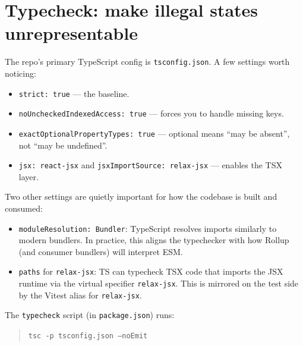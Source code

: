 \section{Typecheck: make illegal states unrepresentable}

The repo's primary TypeScript config is \texttt{tsconfig.json}.
A few settings worth noticing:

\begin{itemize}
\item \texttt{strict: true} --- the baseline.
\item \texttt{noUncheckedIndexedAccess: true} --- forces you to handle missing keys.
\item \texttt{exactOptionalPropertyTypes: true} --- optional means ``may be absent'', not ``may be undefined''.
\item \texttt{jsx: react-jsx} and \texttt{jsxImportSource: relax-jsx} --- enables the TSX layer.
\end{itemize}

Two other settings are quietly important for how the codebase is built and consumed:

\begin{itemize}
\item \texttt{moduleResolution: Bundler}: TypeScript resolves imports similarly to modern bundlers.
In practice, this aligns the typechecker with how Rollup (and consumer bundlers) will interpret ESM.
\item \texttt{paths} for \texttt{relax-jsx}: TS can typecheck TSX code that imports the JSX runtime via the virtual specifier \texttt{relax-jsx}.
This is mirrored on the test side by the Vitest alias for \texttt{relax-jsx}.
\end{itemize}

The \texttt{typecheck} script (in \texttt{package.json}) runs:

\begin{quote}
\texttt{tsc -p tsconfig.json --noEmit}
\end{quote}

